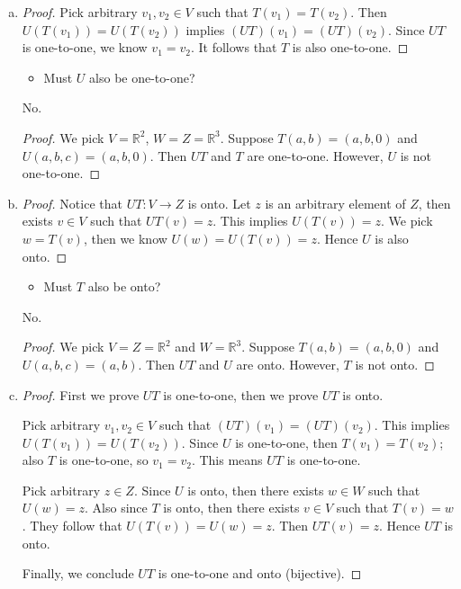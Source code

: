 \begin{Exercise}
	\begin{enumerate}[(a)]
		\item
		\begin{proof}
			Pick arbitrary $v_1, v_2\in V$ such that $T(v_1) = T(v_2)$. Then $U(T(v_1)) = U(T(v_2))$ implies $(UT)(v_1) = (UT)(v_2)$. Since $UT$ is one-to-one, we know $v_1 = v_2$. It follows that $T$ is also one-to-one.
		\end{proof}
		\begin{itemize}
			\item Must $U$ also be one-to-one?
		\end{itemize}
		\begin{answer}
			No.
		\end{answer}
		\begin{proof}
			We pick $V = \mathbb{R}^2$, $W = Z = \mathbb{R}^3$. Suppose $T(a,b) = (a,b,0)$ and $U(a,b,c) = (a,b,0)$. Then $UT$ and $T$ are one-to-one. However, $U$ is not one-to-one.
		\end{proof}
		
		\item
		\begin{proof}
			Notice that $UT:V\to Z$ is onto. Let $z$ is an arbitrary element of $Z$, then exists $v\in V$ such that $UT(v) = z$. This implies $U(T(v)) = z$. We pick $w = T(v)$, then we know $U(w) = U(T(v)) = z$. Hence $U$ is also onto.
		\end{proof}
		\begin{itemize}
			\item Must $T$ also be onto?
		\end{itemize}
		\begin{answer}
			No.
		\end{answer}
		\begin{proof}
			We pick $V=Z=\mathbb{R}^2$ and $W=\mathbb{R}^3$. Suppose $T(a,b) = (a,b,0)$ and $U(a,b,c) = (a,b)$. Then $UT$ and $U$ are onto. However, $T$ is not onto.
		\end{proof}
		
		\item
		\begin{proof}
			First we prove $UT$ is one-to-one, then we prove $UT$ is onto.
			
			Pick arbitrary $v_1,v_2\in V$ such that $(UT)(v_1) = (UT)(v_2)$. This implies $U(T(v_1)) = U(T(v_2))$. Since $U$ is one-to-one, then $T(v_1) = T(v_2)$; also $T$ is one-to-one, so $v_1 = v_2$. This means $UT$ is one-to-one.
			
			Pick arbitrary $z\in Z$. Since $U$ is onto, then there exists $w\in W$ such that $U(w) = z$. Also since $T$ is onto, then there exists $v\in V$ such that $T(v) = w$. They follow that $U(T(v)) = U(w) = z$. Then $UT(v) = z$. Hence $UT$ is onto.
			
			Finally, we conclude $UT$ is one-to-one and onto (bijective).
		\end{proof}
	\end{enumerate}
\end{Exercise}